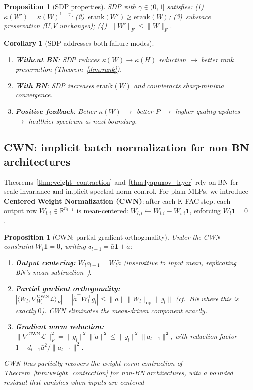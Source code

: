 \documentclass{article}
\newtheorem{proposition}[theorem]{Proposition}
\newtheorem{corollary}[theorem]{Corollary}
\newcommand{\erank}{\mathrm{erank}}
\newcommand{\RR}{\mathbb{R}}
\newcommand{\cL}{\mathcal{L}}
\begin{document}
\begin{proposition}[SDP properties]
\label{prop:sdp}
SDP with $\gamma \in (0,1]$ satisfies: (1)~$\kappa(W') = \kappa(W)^{1-\gamma}$; (2)~$\erank(W') \geq \erank(W)$; (3)~subspace preservation ($U, V$ unchanged); (4)~$\|W'\|_F \leq \|W\|_F$.
\end{proposition}

\begin{corollary}[SDP addresses both failure modes]
\label{cor:synergy}
\begin{enumerate}[nosep]
    \item \textbf{Without BN}: SDP reduces $\kappa(W) \to \kappa(H)$ reduction $\to$ better rank preservation (Theorem~\ref{thm:rank}).
    \item \textbf{With BN}: SDP increases $\erank(W)$ and counteracts sharp-minima convergence.
    \item \textbf{Positive feedback}: Better $\kappa(W)$ $\to$ better $P$ $\to$ higher-quality updates $\to$ healthier spectrum at next boundary.
\end{enumerate}
\end{corollary}

\subsection{CWN: implicit batch normalization for non-BN architectures}
\label{sec:cwn_theory}

Theorems~\ref{thm:weight_contraction} and~\ref{thm:lyapunov_layer} rely on BN for scale invariance and implicit spectral norm control. For plain MLPs, we introduce \textbf{Centered Weight Normalization (CWN)}: after each K-FAC step, each output row $W_{l,i} \in \RR^{n_{l-1}}$ is mean-centered: $W_{l,i} \leftarrow W_{l,i} - \bar{W}_{l,i}\mathbf{1}$, enforcing $W_l\mathbf{1} = 0$.

\begin{proposition}[CWN: partial gradient orthogonality]
\label{prop:cwn_orthogonality}
Under the CWN constraint $W_l\mathbf{1} = 0$, writing $a_{l-1} = \bar{a}\mathbf{1} + \tilde{a}$:
\begin{enumerate}[nosep]
    \item \textbf{Output centering:} $W_l a_{l-1} = W_l\tilde{a}$ (insensitive to input mean, replicating BN's mean subtraction~\citep{huang2017centered}).
    \item \textbf{Partial gradient orthogonality:} $|\langle W_l, \nabla_{W_l}^{\mathrm{CWN}}\cL\rangle_F| = |\tilde{a}^\top W_l^\top g_l| \leq \|\tilde{a}\|\|W_l\|_{\mathrm{op}}\|g_l\|$ (cf.\ BN where this is exactly $0$). CWN eliminates the mean-driven component exactly.
    \item \textbf{Gradient norm reduction:} $\|\nabla^{\mathrm{CWN}}\cL\|_F^2 = \|g_l\|^2\|\tilde{a}\|^2 \leq \|g_l\|^2\|a_{l-1}\|^2$, with reduction factor $1 - d_{l-1}\bar{a}^2/\|a_{l-1}\|^2$.
\end{enumerate}
CWN thus partially recovers the weight-norm contraction of Theorem~\ref{thm:weight_contraction} for non-BN architectures, with a bounded residual that vanishes when inputs are centered.
\end{proposition}
\end{document}
